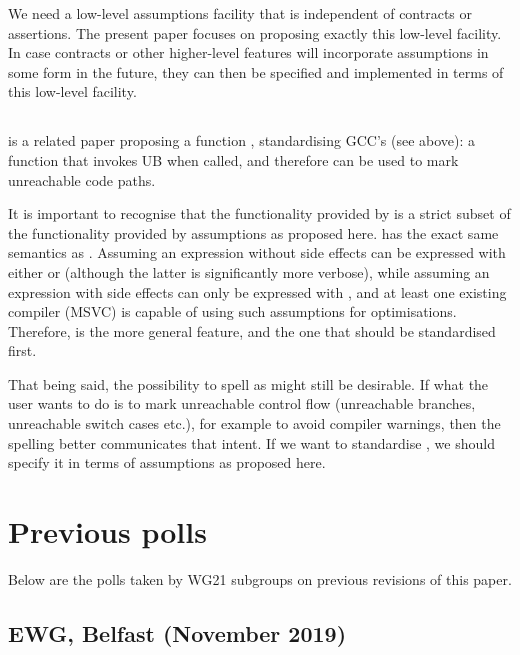 We need a low-level assumptions facility that is independent of contracts or assertions. The present paper focuses on proposing exactly this low-level facility. In case contracts or other higher-level features will incorporate assumptions in some form in the future, they can then be specified and implemented in terms of this low-level facility.

\subsection{}

\cite{P0627R6} is a related paper proposing a function , standardising GCC's  (see above): a function that invokes UB when called, and therefore can be used to mark unreachable code paths.

It is important to recognise that the functionality provided by  is a strict subset of the functionality provided by assumptions as proposed here.  has the exact same semantics as . Assuming an expression without side effects can be expressed with either  or  (although the latter is significantly more verbose), while assuming an expression with side effects can only be expressed with , and at least one existing compiler (MSVC) is capable of using such assumptions for optimisations. Therefore,  is the more general feature, and the one that should be standardised first.

That being said, the possibility to spell  as  might still be desirable. If 
what the user wants to do is to mark unreachable control flow (unreachable branches, unreachable switch cases etc.), for example to avoid compiler warnings, then the spelling  better communicates that intent. If we want to standardise , we should specify it in terms of assumptions as proposed here.

\section {Previous polls}

Below are the polls taken by WG21 subgroups on previous revisions of this paper.


\subsection{EWG, Belfast (November 2019)}

